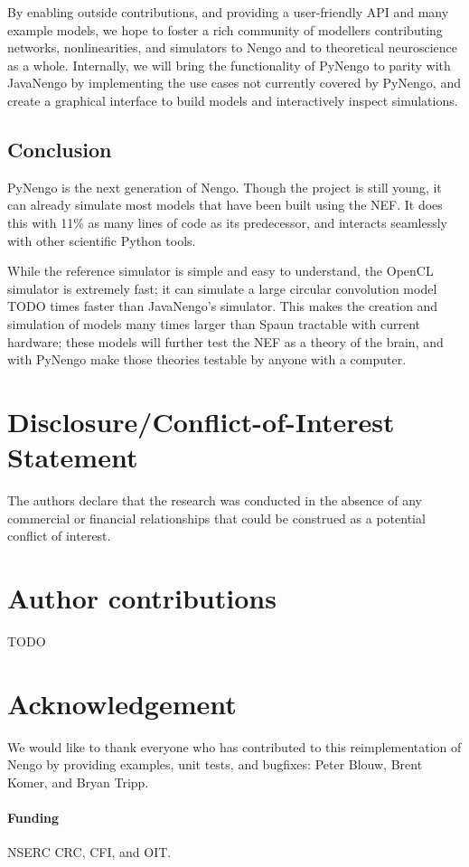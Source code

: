 \documentclass{frontiersSCNS}
\begin{document}
By enabling outside contributions,
and providing a user-friendly API
and many example models,
we hope to foster a rich community of modellers
contributing networks, nonlinearities,
and simulators to Nengo
and to theoretical neuroscience
as a whole.
Internally, we will bring the functionality
of PyNengo to parity with JavaNengo
by implementing the use cases
not currently covered by PyNengo,
and create a graphical interface
to build models and
interactively inspect simulations.

\subsection{Conclusion}

PyNengo is the next generation of Nengo.
Though the project is still young,
it can already simulate most models
that have been built using the NEF.
It does this with 11\% as many lines of code
as its predecessor,
and interacts seamlessly with
other scientific Python tools.

While the reference simulator
is simple and easy to understand,
the OpenCL simulator is extremely fast;
it can simulate a large circular convolution model
TODO times faster than JavaNengo's simulator.
This makes the creation and simulation
of models many times larger than Spaun
tractable with current hardware;
these models will further test
the NEF as a theory of the brain,
and with PyNengo make those theories
testable by anyone with a computer.

\section*{Disclosure/Conflict-of-Interest Statement}

The authors declare that the research was conducted in the absence of
any commercial or financial relationships that could be construed as a
potential conflict of interest.

\section*{Author contributions}

TODO

\section*{Acknowledgement}

We would like to thank
everyone who has contributed
to this reimplementation of Nengo
by providing examples,
unit tests, and bugfixes:
Peter Blouw, Brent Komer, and Bryan Tripp.


\paragraph{Funding\textcolon}
NSERC CRC, CFI, and OIT.



\end{document}
